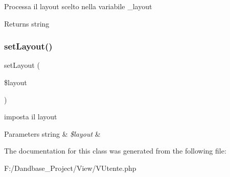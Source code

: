 Processa il layout scelto nella variabile \+\_\+layout

\begin{DoxyReturn}{Returns}
string 
\end{DoxyReturn}
\mbox{\label{class_v_utente_a702b3376618a26e6c02c05bae65c6b9e}} 
\subsubsection{\texorpdfstring{set\+Layout()}{setLayout()}}
{\footnotesize\ttfamily set\+Layout (\begin{DoxyParamCaption}\item[{}]{\$layout }\end{DoxyParamCaption})}

imposta il layout


\begin{DoxyParams}[1]{Parameters}
string & {\em \$layout} & \\
\hline
\end{DoxyParams}


The documentation for this class was generated from the following file\+:\begin{DoxyCompactItemize}
\item 
F\+:/\+Dandbase\+\_\+\+Project/\+View/V\+Utente.\+php\end{DoxyCompactItemize}
